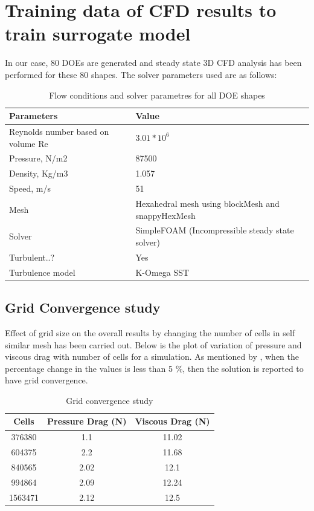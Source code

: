 \chapter{Training data of CFD results to train surrogate model}
\label{Training data CFD}
In our case, 80 DOEs are generated and steady state 3D CFD analysis has been performed for these 80 shapes. The solver parameters used are as follows:
\begin{table}[H]
	\caption{Flow conditions and solver parametres for all DOE shapes}
	\label{Flow conditions and solver parametres for all DOE shapes}
	\centering
	\begin{tabular}{ll}
		\hline \hline
		Parameters & Value \\ 
		\hline \hline
		Reynolds number based on volume Re & $ 3.01 \ast 10^6 $ \\
		Pressure, N/m2 & 87500 \\
		Density, Kg/m3 & 1.057 \\
		Speed, m/s & 51 \\
		Mesh & Hexahedral mesh using blockMesh and snappyHexMesh \\
		Solver & SimpleFOAM (Incompressible steady state solver) \\
		Turbulent..? & Yes \\
		Turbulence model & K-Omega SST \\
		\hline \hline
	\end{tabular}
\end{table}
\section{Grid Convergence study}

Effect of grid size on the overall results by  changing the number of cells in self similar mesh has been carried out. Below is the plot of variation of pressure and viscous drag with number of cells for a simulation. As mentioned by \cite{Suman2011} , when the percentage change in the values is less than 5 \%, then the solution is reported to have grid convergence.

\begin{table}[H]
	\caption{Grid convergence study}
	\label{Grid convergence table}
	\centering
	\begin{tabular}{ccc}
		\hline \hline
		Cells & Pressure Drag (N) & Viscous Drag (N) \\
		\hline \hline
		376380 & 1.1  & 11.02 \\
		604375  & 2.2  & 11.68 \\
		840565  & 2.02  & 12.1 \\
		994864  & 2.09  & 12.24 \\
		1563471  & 2.12 & 12.5 \\
		\hline \hline
	\end{tabular}
\end{table}

